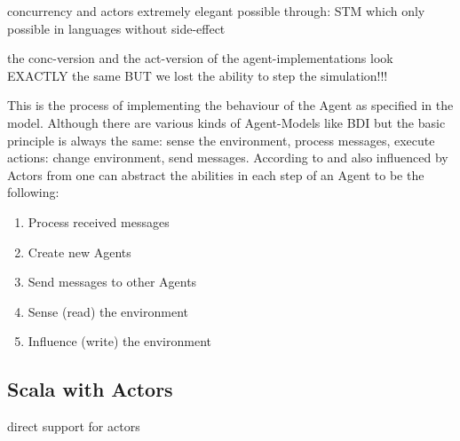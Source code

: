 concurrency and actors extremely elegant possible through: STM which only possible in languages without side-effect	

the conc-version and the act-version of the agent-implementations look EXACTLY the same	 BUT we lost the ability to step the simulation!!!

This is the process of implementing the behaviour of the Agent as specified in the model. Although there are various kinds of Agent-Models like BDI but the basic principle is always the same: sense the environment, process messages, execute actions: change environment, send messages. According to \cite{wooldridge_introduction_2009} and also influenced by Actors from \cite{agha_actors:_1986} one can abstract the abilities in each step of an Agent to be the following:

\begin{enumerate}
\item Process received messages
\item Create new Agents
\item Send messages to other Agents
\item Sense (read) the environment
\item Influence (write) the environment
\end{enumerate}


\subsection{Scala with Actors}
direct support for actors
